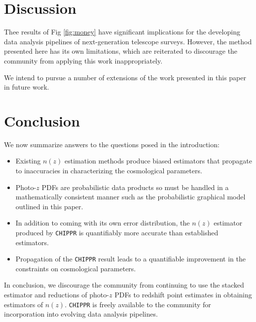 \documentclass[iop]{emulateapj}
\newcommand{\chippr}{\texttt{CHIPPR} }
\begin{document}
\section{Discussion}
\label{sec:discussion}

Thee results of Fig \ref{fig:money} have significant implications for the developing data analysis pipelines of next-generation telescope surveys.  However, the method presented here has its own limitations, which are reiterated to discourage the community from applying this work inappropriately.

We intend to pursue a number of extensions of the work presented in this paper in future work.

\section{Conclusion}
\label{sec:conclusion}

We now summarize answers to the questions posed in the introduction:

\begin{itemize}
	\item Existing $n(z)$ estimation methods produce biased estimators that propagate to inaccuracies in characterizing the cosmological parameters.
	\item Photo-$z$ PDFs are probabilistic data products so must be handled in a mathematically consistent manner such as the probabilistic graphical model outlined in this paper.
	\item In addition to coming with its own error distribution, the $n(z)$ estimator produced by \chippr is quantifiably more accurate than established estimators.
	\item Propagation of the \chippr result leads to a quantifiable improvement in the constraints on cosmological parameters.
\end{itemize}

In conclusion, we discourage the community from continuing to use the stacked estimator and reductions of photo-$z$ PDFs to redshift point estimates in obtaining estimators of $n(z)$.  \chippr is freely available to the community for incorporation into evolving data analysis pipelines.  
\end{document}

